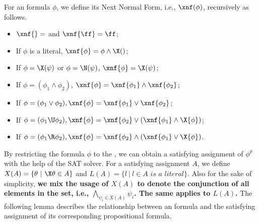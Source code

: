 \begin{definition}\label{def:xnf}
For an \ltlf formula $\phi$, we define its Next Normal Form, i.e., $\xnf(\phi)$, recursively as follows. 
\begin{itemize}
\item $\xnf{\tt} = \tt$ and $\xnf{\ff} = \ff$;
\item If $\phi$ is a literal, $\xnf{\phi} = \phi \wedge \X(\tt)$;
\item If $\phi = \X(\psi)$ or $\phi = \N(\psi)$, $\xnf{\phi} = \X(\psi)$;
\item If $\phi = (\phi_1 \wedge \phi_2)$, $\xnf{\phi} = \xnf{\phi_1}\wedge\xnf{\phi_2}$;
\item If $\phi = (\phi_1 \vee \phi_2), \xnf{\phi} = \xnf{\phi_1}\vee \xnf{\phi_2}$; 
\item If $\phi = (\phi_1 \U \phi_2), \xnf{\phi} = \xnf{\phi_2} \vee (\xnf{\phi_1} \wedge \X{\phi})$; 
\item If $\phi = (\phi_1 \R \phi_2), \xnf{\phi} = \xnf{\phi_2}\wedge (\xnf{\phi_1} \vee \X{\phi})$.
\end{itemize}
\end{definition}

By restricting the \ltlf formula $\phi$ to the \XNF, we can obtain a satisfying assignment of $\phi^{p}$ with the help of the SAT solver.
For a satisfying assignment $A$, we define $X(A)=\{\theta\ |\ \X\theta\in A\}$ and $L(A) =\{l\ |\ l \in A \textit{ is a literal}\}$. Also for the sake of simplicity, \textbf{we mix the usage of $X(A)$ to denote the conjunction of all elements in the set, i.e., $\bigwedge_{\psi_i\in X(A)}\psi_i$. The same applies to $L(A)$.}
The following lemma describes the relationship between an \ltlf formula and the satisfying assignment of its corresponding propositional formula.

